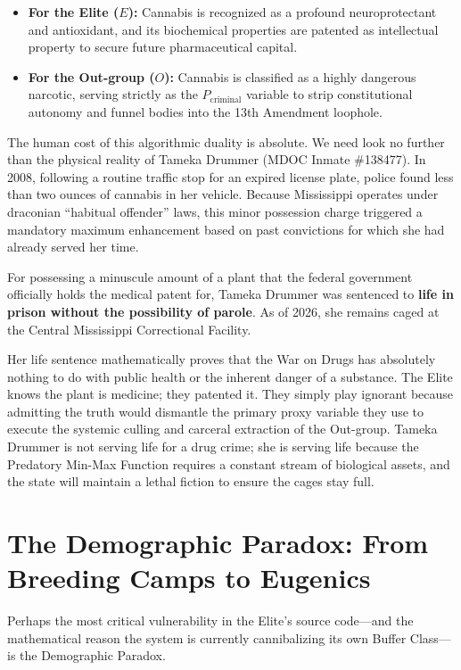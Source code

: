 \documentclass[12pt,openany]{book}
\begin{document}
\begin{itemize}
    \item \textbf{For the Elite ($E$):} Cannabis is recognized as a profound neuroprotectant and antioxidant, and its biochemical properties are patented as intellectual property to secure future pharmaceutical capital.

    \item \textbf{For the Out-group ($O$):} Cannabis is classified as a highly dangerous narcotic, serving strictly as the $P_{\text{criminal}}$ variable to strip constitutional autonomy and funnel bodies into the 13th Amendment loophole.
\end{itemize}

The human cost of this algorithmic duality is absolute. We need look no further than the physical reality of Tameka Drummer (MDOC Inmate \#138477). In 2008, following a routine traffic stop for an expired license plate, police found less than two ounces of cannabis in her vehicle. Because Mississippi operates under draconian ``habitual offender'' laws, this minor possession charge triggered a mandatory maximum enhancement based on past convictions for which she had already served her time.

For possessing a minuscule amount of a plant that the federal government officially holds the medical patent for, Tameka Drummer was sentenced to \textbf{life in prison without the possibility of parole}. As of 2026, she remains caged at the Central Mississippi Correctional Facility.

Her life sentence mathematically proves that the War on Drugs has absolutely nothing to do with public health or the inherent danger of a substance. The Elite knows the plant is medicine; they patented it. They simply play ignorant because admitting the truth would dismantle the primary proxy variable they use to execute the systemic culling and carceral extraction of the Out-group. Tameka Drummer is not serving life for a drug crime; she is serving life because the Predatory Min-Max Function requires a constant stream of biological assets, and the state will maintain a lethal fiction to ensure the cages stay full.

\section{The Demographic Paradox: From Breeding Camps to Eugenics}

Perhaps the most critical vulnerability in the Elite's source code---and the mathematical reason the system is currently cannibalizing its own Buffer Class---is the Demographic Paradox.
\end{document}
